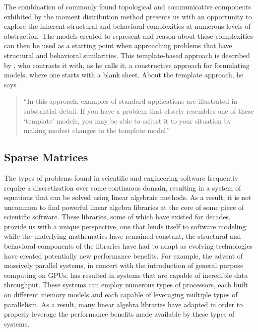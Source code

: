 \documentclass[12pt]{article}
\begin{document}

The combination of commonly found topological and communicative components exhibited by the moment distribution method presents us with an opportunity to explore the inherent structural and behavioral complexities at numerous levels of abstraction.  The models created to represent and reason about these complexities can then be used as a starting point when approaching problems that have structural and behavioral similarities.  This template-based approach is described by \cite{schrage1991}, who contrasts it with, as he calls it, a constructive approach for formulating models, where one starts with a blank sheet.  About the template approach, he says 

\begin{quote}
``In this approach, examples of standard applications are illustrated
in substantial detail. If you have a problem that closely resembles
one of these `template' models, you may be able to adjust it to your
situation by making modest changes to the template model.''
\end{quote}

\subsection{Sparse Matrices}

The types of problems found in scientific and engineering software frequently require a discretization over some continuous domain, resulting in a system of equations that can be solved using linear algebraic methods.  As a result, it is not uncommon to find powerful linear algebra libraries at the core of some piece of scientific software.  These libraries, some of which have existed for decades, provide us with a unique perspective, one that lends itself to software modeling: while the underlying mathematics have remained constant, the structural and behavioral components of the libraries have had to adapt as evolving technologies have created potentially new performance benefits.  For example, the advent of massively parallel systems, in concert with the introduction of general purpose computing on GPUs, has resulted in systems that are capable of incredible data throughput.  These systems can employ numerous types of processors, each built on different memory models and each capable of leveraging multiple types of parallelism.  As a result, many linear algebra libraries have adapted in order to properly leverage the performance benefits made available by these types of systems.
\end{document}
